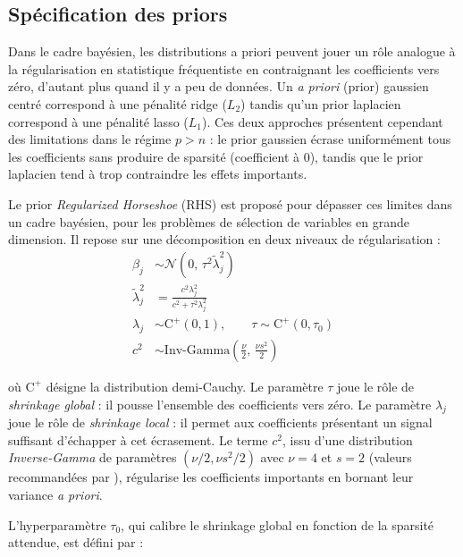 \subsection{Spécification des priors}\label{sec:prior}

Dans le cadre bayésien, les distributions a priori peuvent jouer un rôle analogue à la régularisation en statistique fréquentiste en contraignant les coefficients vers zéro, d'autant plus quand il y a peu de données. Un \textit{a priori} (prior) gaussien centré correspond à une pénalité ridge ($L_2$) tandis qu'un prior laplacien correspond à une pénalité lasso ($L_1$). Ces deux approches présentent cependant des limitations dans le régime $p > n$ : le prior gaussien écrase uniformément tous les coefficients sans produire de sparsité (coefficient à 0), tandis que le prior laplacien tend à trop contraindre les effets importants.

\medskip 

Le prior \textit{Regularized Horseshoe} (RHS) \parencite{Piironen2017Jul} est proposé pour dépasser ces limites dans un cadre bayésien, pour les problèmes de sélection de variables en grande dimension. Il repose sur une décomposition en deux niveaux de régularisation :
\begin{align*}
	\beta_j &\sim \mathcal{N}(0,\, \tau^2 \tilde{\lambda}_j^2) \\
	\tilde{\lambda}_j^2 &= \frac{c^2 \lambda_j^2}{c^2 + \tau^2 \lambda_j^2} \\
	\lambda_j &\sim \mathrm{C}^+(0, 1), \qquad 
	\tau \sim \mathrm{C}^+(0, \tau_0) \\
	c^2 &\sim \mathrm{Inv\text{-}Gamma}\!\left(\frac{\nu}{2},\, 
	\frac{\nu s^2}{2}\right)
\end{align*}

où $\mathrm{C}^+$ désigne la distribution demi-Cauchy. Le paramètre $\tau$ joue le rôle de \textit{shrinkage global} : il pousse l'ensemble des coefficients vers zéro. Le paramètre $\lambda_j$ joue le rôle de \textit{shrinkage local} : il permet aux coefficients présentant un signal suffisant d'échapper à cet écrasement. Le terme $c^2$, issu d'une distribution \textit{Inverse-Gamma} de paramètres $(\nu/2, \nu s^2/2)$ avec $\nu = 4$ et $s = 2$ (valeurs recommandées par \cite{Piironen2017Jul}), régularise les coefficients importants en bornant leur variance \textit{a priori}.

L'hyperparamètre $\tau_0$, qui calibre le shrinkage global en fonction de la sparsité attendue, est défini par :

